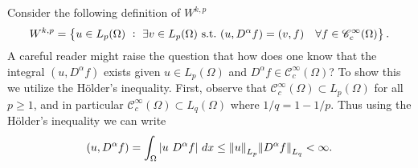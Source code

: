\begin{beCareful}
	Consider the following definition of $ W^{k,p} $
	\[ W^{k,p} = \Set{u \in L_p(\Omega)\ :\ \exists v \in L_p(\Omega) \st (u,D^\alpha f) = (v,f) \quad \forall f \in \mathscr{C}^\infty_c(\Omega)}. \]
	A careful reader might raise the question that how does one know that the integral $ (u, D^\alpha f) $ exists given $ u \in L_p(\Omega) $ and $ D^\alpha f \in \mathscr{C}^\infty_c(\Omega) $? To show this we utilize the H\"{o}lder's inequality. First, observe that $ \mathscr{C}^\infty_c(\Omega) \subset L_p(\Omega)$ for all $ p\geq 1 $, and in particular $ \mathscr{C}^\infty_c(\Omega) \subset L_q(\Omega) $ where $ 1/q = 1-1/p $. Thus using the H\"{o}lder's inequality we can write
	\[ (u, D^\alpha f) = \int_\Omega |u\ D^\alpha f|\ dx \leq \norm{u}_{L_p} \norm{D^\alpha f}_{L_q} < \infty. \]
\end{beCareful}
